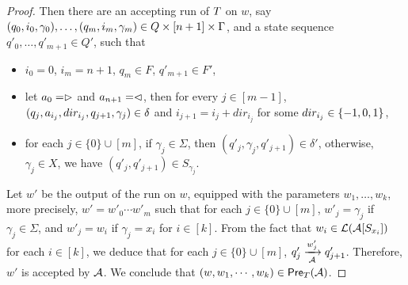 \begin{proof}
Then  there are an accepting run of $T$ on $w$, 
say $(q_0, i_0, \gamma_0),\ldots, (q_m, i_m, \gamma_m) \in Q \times [n+1] \times \Gamma$, and a state sequence $q'_0, \ldots, q'_{m+1} \in Q'$, such that 
\begin{itemize}
\item $i_0=0$, $i_m = n+1$, $q_m \in F$, $q'_{m+1} \in F'$,
%
\item let $a_0 = \vartriangleright$ and $a_{n+1} = \vartriangleleft$,  then for every $j \in [m-1]$, $(q_j, a_{i_j}, dir_{i_j}, q_{j+1}, \gamma_j) \in
        \delta$ and $i_{j+1} = i_j + dir_{i_j}$ for some $dir_{i_j} \in \{-1, 0, 1\}$, 
 \item for each $j \in \{0\} \cup [m]$, if $\gamma_j \in \Sigma$, then $(q'_j, \gamma_j, q'_{j+1}) \in \delta'$, otherwise, $\gamma_j \in X$, we have $(q'_j, q'_{j+1}) \in S_{\gamma_j}$. 
\end{itemize}
Let $w'$ be the output of the run on $w$, equipped with the parameters $w_1,\ldots, w_k$, more precisely, $w' = w'_0 \cdots w'_m$ such that for each $j \in \{0\} \cup [m]$, $w'_j = \gamma_j$ if $\gamma_j \in \Sigma$, and $w'_j = w_i$ if $\gamma_j = x_i$ for $i \in [k]$. From the fact that $w_i \in \mathcal{L}(\mathcal{A}[S_{x_i}])$ for each $i \in [k]$, we deduce that for each $j \in \{0\} \cup [m]$, $q'_j \xrightarrow[\mathcal{A}]{w'_j} q'_{j+1}$.
Therefore, $w'$ is accepted by $\mathcal{A}$.
We conclude that $(w, w_1,\cdots, w_k) \in \textsf{Pre}_{T}(\mathcal{A})$.
\end{proof}